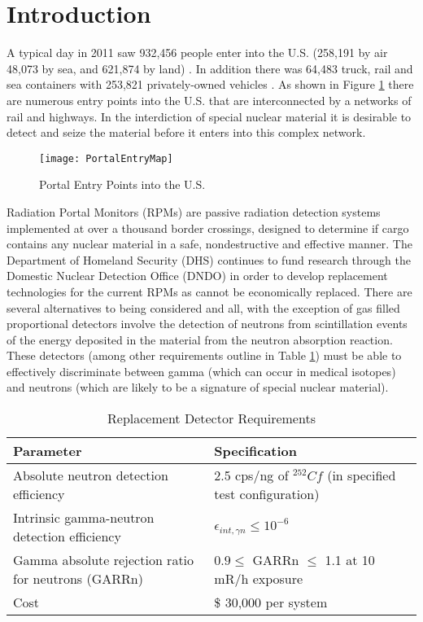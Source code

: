 \section{Introduction}

A typical day in 2011 saw 932,456 people enter into the U.S. (258,191 by air 48,073 by sea, and 621,874 by land) \cite{cpb_typical_2012}.
In addition there was 64,483 truck, rail and sea containers with 253,821 privately-owned vehicles \cite{cpb_typical_2012}.
As shown in Figure \ref{fig:PortalEntryMap} there are numerous entry points into the U.S. that are interconnected by a networks of rail and highways.
In the interdiction of special nuclear material it is desirable to detect and seize the material before it enters into this complex network.
\begin{figure}[h]
    \texttt{[image: PortalEntryMap]}
	\caption{Portal Entry Points into the U.S.}
    \label{fig:PortalEntryMap}
\end{figure}
Radiation Portal Monitors (RPMs) are passive radiation detection systems implemented at over a thousand border crossings, designed to determine if cargo contains any nuclear material in a safe, nondestructive and effective manner\cite{kouzes_neutron_2010}.
The Department of Homeland Security (DHS) continues to fund research through the Domestic Nuclear Detection Office (DNDO) in order to develop replacement technologies for the current  RPMs as  cannot be economically replaced.
There are several alternatives to  being considered and all, with the exception of gas filled proportional detectors involve the detection of neutrons from scintillation events of the energy deposited in the material from the neutron absorption reaction.
These detectors (among other requirements outline in Table \ref{tab:DHSCriteria}) must be able to effectively discriminate between gamma (which can occur in medical isotopes) and neutrons (which are likely to be a signature of special nuclear material).
\begin{table}[h]
    \caption{Replacement Detector Requirements \protect\cite{kouzes_neutron_1999}}
	\centering
	\begin{tabular}{p{} | p{} }
	Parameter & Specification \\
	\hline
	\hline
	Absolute neutron detection efficiency & 2.5 cps/ng of ${}^{252}Cf$ (in specified test configuration) \\
	Intrinsic gamma-neutron detection efficiency & $ \epsilon_{int,\gamma n}\leq 10^{-6}$ \\
	Gamma absolute rejection ratio for neutrons (GARRn) & $ 0.9 \leq \text{ GARRn }\leq$ 1.1 at 10 mR/h exposure \\
	Cost &  \$ 30,000 per system \\
	\hline
	\end{tabular}
    \label{tab:DHSCriteria}
\end{table}

